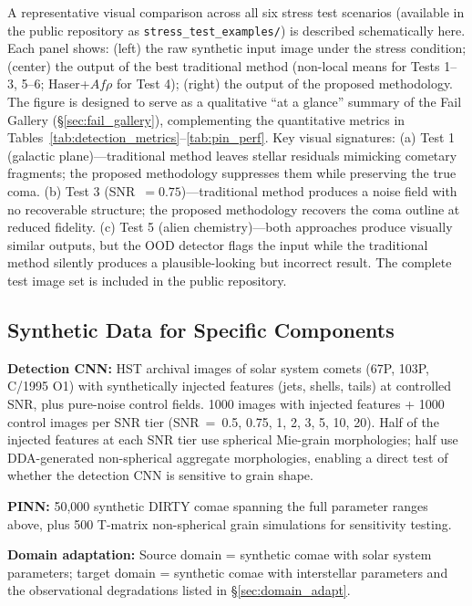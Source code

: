 \documentclass[usenatbib]{mnras}
\begin{document}
A representative visual comparison across all six stress test scenarios (available in the public repository as \texttt{stress\_test\_examples/}) is described schematically here. Each panel shows: (left) the raw synthetic input image under the stress condition; (center) the output of the best traditional method (non-local means for Tests 1--3, 5--6; Haser+$Af\rho$ for Test 4); (right) the output of the proposed methodology. The figure is designed to serve as a qualitative ``at a glance'' summary of the Fail Gallery (\S\ref{sec:fail_gallery}), complementing the quantitative metrics in Tables~\ref{tab:detection_metrics}--\ref{tab:pin_perf}. Key visual signatures: (a) Test 1 (galactic plane)---traditional method leaves stellar residuals mimicking cometary fragments; the proposed methodology suppresses them while preserving the true coma. (b) Test 3 (SNR~$=0.75$)---traditional method produces a noise field with no recoverable structure; the proposed methodology recovers the coma outline at reduced fidelity. (c) Test 5 (alien chemistry)---both approaches produce visually similar outputs, but the OOD detector flags the input while the traditional method silently produces a plausible-looking but incorrect result. The complete test image set is included in the public repository.

\subsection{Synthetic Data for Specific Components}

\textbf{Detection CNN:} HST archival images of solar system comets (67P, 103P, C/1995 O1) with synthetically injected features (jets, shells, tails) at controlled SNR, plus pure-noise control fields. 1000 images with injected features + 1000 control images per SNR tier (SNR~=~0.5, 0.75, 1, 2, 3, 5, 10, 20). Half of the injected features at each SNR tier use spherical Mie-grain morphologies; half use DDA-generated non-spherical aggregate morphologies, enabling a direct test of whether the detection CNN is sensitive to grain shape.

\textbf{PINN:} 50,000 synthetic DIRTY comae spanning the full parameter ranges above, plus 500 T-matrix non-spherical grain simulations for sensitivity testing.

\textbf{Domain adaptation:} Source domain = synthetic comae with solar system parameters; target domain = synthetic comae with interstellar parameters and the observational degradations listed in \S\ref{sec:domain_adapt}.
\end{document}

